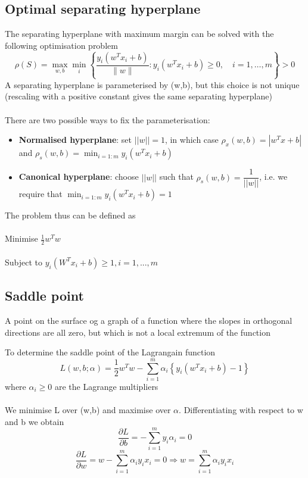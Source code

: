 \documentclass{article}[18pt]
\begin{document}
\subsection{Optimal separating hyperplane}
The separating hyperplane with maximum margin can be solved with the following optimisation problem
$$\rho(S)=\max _{w, b} \min _{i}\left\{\frac{y_{i}\left(w^{T} x_{i}+b\right)}{\|w\|}: y_{i}\left(w^{T} x_{i}+b\right) \geq 0, \quad i=1, \ldots, m\right\}>0$$
A separating hyperplane is parameterised by (w,b), but this choice is not unique (rescaling with a positive constant gives the same separating hyperplane)\\
\\
There are two possible ways to fix the parameterisation:
\begin{itemize}
	\item \textbf{Normalised hyperplane}: set $||w||=1$, in which case $\rho_{x}(w,b)=|w^Tx+b|$ and $\rho_s(w,b)=\min_{i=1:m}y_i(w^Tx_i+b)$
	\item \textbf{Canonical hyperplane}: choose $||w||$ such that $\rho_s(w,b)=\dfrac{1}{||w||}$, i.e. we require that $\min_{i=1:m}y_i(w^Tx_i+b)=1$ 
\end{itemize} 
The problem thus can be defined as\\
\\
Minimise $\frac{1}{2}w^Tw$\\
\\
Subject to $y_i(W^Tx_i+b)\geqslant1, i=1,...,m$
\subsection{Saddle point}
\begin{definition}
A point on the surface og a graph of a function where the slopes in orthogonal directions are all zero, but which is not a local extremum of the function
\end{definition}
To determine the saddle point of the Lagrangain function
$$L(w, b ; \alpha)=\frac{1}{2} w^{T} w-\sum_{i=1}^{m} \alpha_{i}\left\{y_{i}\left(w^{T} x_{i}+b\right)-1\right\}$$
where $\alpha_{i}\geqslant0$ are the Lagrange multipliers\\
\\
We minimise L over (w,b) and maximise over $\alpha$. Differentiating with respect to w and b we obtain
$$\frac{\partial L}{\partial b}=-\sum_{i=1}^{m} y_{i} \alpha_{i}=0$$
$$\frac{\partial L}{\partial w}=w-\sum_{i=1}^{m} \alpha_{i} y_{i} x_{i}=0 \Rightarrow w=\sum_{i=1}^{m} \alpha_{i} y_{i} x_{i}$$
\end{document}
